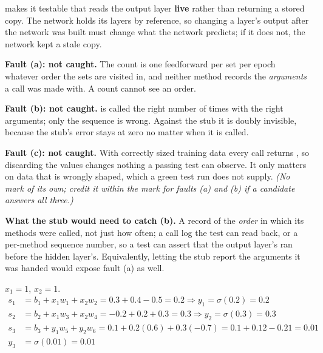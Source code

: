 \textbf{} makes it testable that  reads the output layer
\textbf{live} rather than returning a stored copy. The network holds its layers by reference, so
changing a layer's output after the network was built must change what the network predicts; if it
does not, the network kept a stale copy. 

\textbf{Fault (a): not caught.} The count is one feedforward per set per epoch whatever order the sets
are visited in, and neither method records the \emph{arguments} a call was made with. A count cannot
see an order. 

\textbf{Fault (b): not caught.}  is called the right number of times with the
right arguments; only the sequence is wrong. Against the stub it is doubly invisible, because the
stub's error stays at zero no matter when it is called. 

\textbf{Fault (c): not caught.} With correctly sized training data every call returns , so
discarding the values changes nothing a passing test can observe. It only matters on data that is
wrongly shaped, which a green test run does not supply. \textit{(No mark of its own; credit it within
the mark for faults (a) and (b) if a candidate answers all three.)}

\textbf{What the stub would need to catch (b).} A record of the \emph{order} in which its methods
were called, not just how often; a call log the test can read back, or a per-method sequence number,
so a test can assert that the output layer's  ran before the hidden layer's.
Equivalently, letting the stub report the arguments it was handed would expose fault (a) as well.


$x_1 = 1$, $x_2 = 1$.
\begin{align*}
  s_1 &= b_1 + x_1 w_1 + x_2 w_2 = 0.3 + 0.4 - 0.5 = 0.2 \Rightarrow y_1 = \sigma(0.2) =
    \mathbf{0.2} \\
  s_2 &= b_2 + x_1 w_3 + x_2 w_4 = -0.2 + 0.2 + 0.3 = 0.3 \Rightarrow y_2 = \sigma(0.3) =
    \mathbf{0.3} \\
  s_3 &= b_3 + y_1 w_5 + y_2 w_6 = 0.1 + 0.2(0.6) + 0.3(-0.7) = 0.1 + 0.12 - 0.21 = 0.01 \\
  y_3 &= \sigma(0.01) = \mathbf{0.01}
\end{align*}

